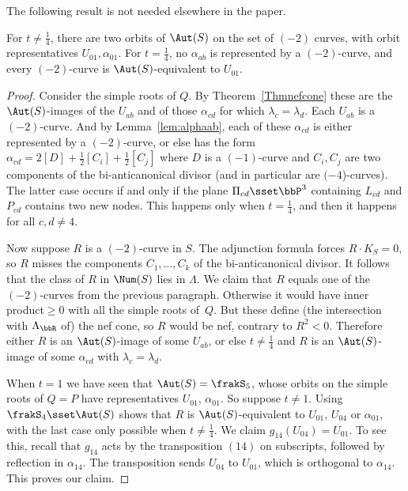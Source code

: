 The following result is not needed elsewhere in the paper.

\begin{theo}\label{ThmOrbitsOnCurves}
For $t\neq\frac14$, there are two orbits of $\Aut(S)$ on the set of $(-2)$ curves, with orbit representatives $U_{01},\alpha_{01}$. For $t=\frac14$, no $\alpha_{ab}$ is represented by a $(-2)$-curve, and every $(-2)$-curve is $\Aut(S)$-equivalent to $U_{01}$.
\end{theo}

\begin{proof}
Consider the simple roots of $Q$. By Theorem~\ref{Thmnefcone} these are the $\Aut(S)$-images of the $U_{ab}$ and of those $\alpha_{cd}$ for which $\lambda_c=\lambda_d$. Each $U_{ab}$ is a $(-2)$-curve. And by Lemma~\ref{lem:alphaab}, each of these $\alpha_{cd}$ is either represented by a $(-2)$-curve, or else has the form $\alpha_{cd}=2[D]+\frac12[C_i]+\frac12[C_j]$ where $D$ is a $(-1)$-curve and $C_i,C_j$ are two components of the bi-anticanonical divisor (and in particular are $(-4$)-curves). The latter case occurs if and only if the plane $\Pi_{cd}\sset\bbP^3$ containing $L_{cd}$ and $P_{cd}$ contains two new nodes. This happens only when $t=\frac14$, and then it happens for all $c,d\neq4$.

Now suppose $R$ is a $(-2)$-curve in $S$. The adjunction formula forces $R\cdot K_S=0$, so $R$ misses the components $C_1,\dots,C_k$ of the bi-anticanonical divisor. It follows that the class of $R$ in $\Num(S)$ lies in $\Lambda$. We claim that $R$ equals one of the $(-2)$-curves from the previous paragraph. Otherwise it would have inner product${ }\geq0$ with all the simple roots of~$Q$. But these define (the intersection with $\Lambda_\bbR$ of) the nef cone, so $R$ would be nef, contrary to $R^2<0$. Therefore either $R$ is an $\Aut(S)$-image of some $U_{ab}$, or else $t\neq\frac14$ and $R$ is an $\Aut(S)$-image of some $\alpha_{cd}$ with $\lambda_c=\lambda_d$.

When $t=1$ we have seen that $\Aut(S)=\frakS_5$, whose orbits on the simple roots of $Q=P$ have representatives $U_{01}$, $\alpha_{01}$. So suppose $t\neq1$. Using $\frakS_4\sset\Aut(S)$ shows that $R$ is $\Aut(S)$-equivalent to $U_{01}$, $U_{04}$ or $\alpha_{01}$, with the last case only possible when $t\neq\frac14$. We claim $g_{14}(U_{04})=U_{01}$. To see this, recall that $g_{14}$ acts by the transposition $(14)$ on subscripts, followed by reflection in $\alpha_{14}$. The transposition sends $U_{04}$ to $U_{01}$, which is orthogonal to $\alpha_{14}$. This proves our claim.


\end{proof}
